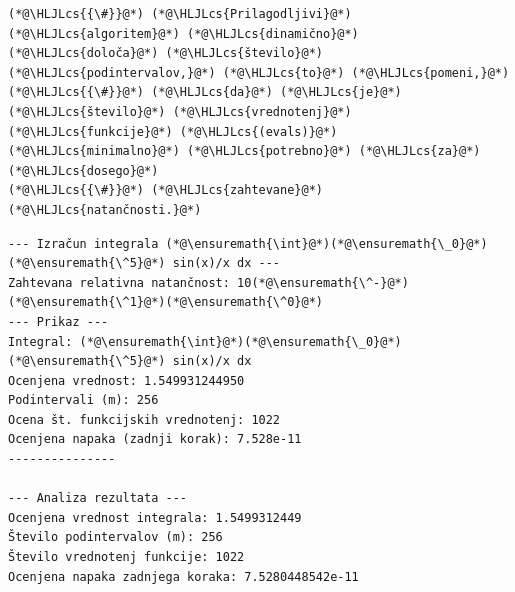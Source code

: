 \documentclass[12pt,a4paper]{article}
\newcommand{\HLJLcs}[1]{\textcolor[RGB]{153,153,119}{\textit{#1}}}
\begin{document}
\begin{lstlisting}
(*@\HLJLcs{{\#}}@*) (*@\HLJLcs{Prilagodljivi}@*) (*@\HLJLcs{algoritem}@*) (*@\HLJLcs{dinamično}@*) (*@\HLJLcs{določa}@*) (*@\HLJLcs{število}@*) (*@\HLJLcs{podintervalov,}@*) (*@\HLJLcs{to}@*) (*@\HLJLcs{pomeni,}@*)
(*@\HLJLcs{{\#}}@*) (*@\HLJLcs{da}@*) (*@\HLJLcs{je}@*) (*@\HLJLcs{število}@*) (*@\HLJLcs{vrednotenj}@*) (*@\HLJLcs{funkcije}@*) (*@\HLJLcs{(evals)}@*) (*@\HLJLcs{minimalno}@*) (*@\HLJLcs{potrebno}@*) (*@\HLJLcs{za}@*) (*@\HLJLcs{dosego}@*)
(*@\HLJLcs{{\#}}@*) (*@\HLJLcs{zahtevane}@*) (*@\HLJLcs{natančnosti.}@*)
\end{lstlisting}

\begin{lstlisting}
--- Izračun integrala (*@\ensuremath{\int}@*)(*@\ensuremath{\_0}@*)(*@\ensuremath{\^5}@*) sin(x)/x dx ---
Zahtevana relativna natančnost: 10(*@\ensuremath{\^-}@*)(*@\ensuremath{\^1}@*)(*@\ensuremath{\^0}@*)
--- Prikaz ---
Integral: (*@\ensuremath{\int}@*)(*@\ensuremath{\_0}@*)(*@\ensuremath{\^5}@*) sin(x)/x dx
Ocenjena vrednost: 1.549931244950
Podintervali (m): 256
Ocena št. funkcijskih vrednotenj: 1022
Ocenjena napaka (zadnji korak): 7.528e-11
---------------

--- Analiza rezultata ---
Ocenjena vrednost integrala: 1.5499312449
Število podintervalov (m): 256
Število vrednotenj funkcije: 1022
Ocenjena napaka zadnjega koraka: 7.5280448542e-11
\end{lstlisting}
\end{document}
